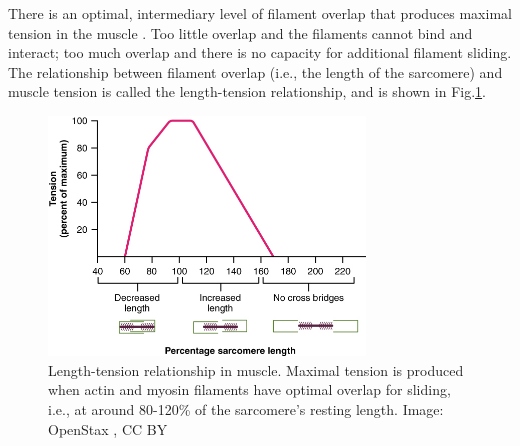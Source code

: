 \documentclass[12pt]{article}
\begin{document}
There is an optimal, intermediary level of filament overlap that produces maximal tension in the muscle \cite{openStax2016nervous}. Too little overlap and the filaments cannot bind and interact; too much overlap and there is no capacity for additional filament sliding. The relationship between filament overlap (i.e., the length of the sarcomere) and muscle tension is called the length-tension relationship, and is shown in Fig.\ref{fig:tension}.

\begin{figure}[h!]
\centering
\includegraphics[width=0.75\textwidth]{figures/lengthTension.jpg}
\caption{Length-tension relationship in muscle. Maximal tension is produced when actin and myosin filaments have optimal overlap for sliding, i.e., at around 80-120\% of the sarcomere's resting length. Image: OpenStax \cite{openStax2016nervous}, CC BY}
\label{fig:tension}
\end{figure}
\end{document}
